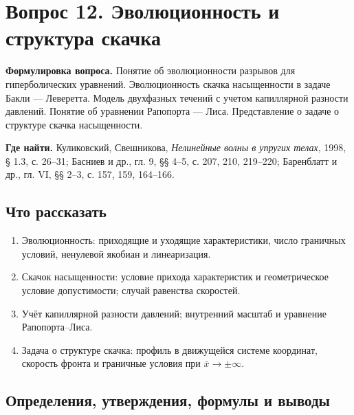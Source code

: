 \documentclass[12pt,a4paper]{article}
\newcounter{questionnumber}
\begin{document}
\clearpage
\setcounter{questionnumber}{12}
\setcounter{equation}{0}
\setcounter{footnote}{0}
\section*{Вопрос 12. Эволюционность и структура скачка}
\textbf{Формулировка вопроса.} Понятие об эволюционности разрывов для гиперболических уравнений. Эволюционность скачка насыщенности в задаче Бакли — Леверетта. Модель двухфазных течений с учетом капиллярной разности давлений. Понятие об уравнении Рапопорта — Лиса. Представление о задаче о структуре скачка насыщенности.

\medskip
\textbf{Где найти.} Куликовский, Свешникова, \textit{Нелинейные волны в упругих телах}, 1998, § 1.3, с. 26--31; Басниев и др., гл. 9, §§ 4--5, с. 207, 210, 219--220; Баренблатт и др., гл. VI, §§ 2--3, с. 157, 159, 164--166.

\subsection*{Что рассказать}
\begin{enumerate}
\item Эволюционность: приходящие и уходящие характеристики, число граничных условий, ненулевой якобиан и линеаризация.
\item Скачок насыщенности: условие прихода характеристик и геометрическое условие допустимости; случай равенства скоростей.
\item Учёт капиллярной разности давлений; внутренний масштаб и уравнение Рапопорта--Лиса.
\item Задача о структуре скачка: профиль в движущейся системе координат, скорость фронта и граничные условия при $\bar x\to\pm\infty$.
\end{enumerate}
\subsection*{Определения, утверждения, формулы и выводы}
\begingroup
\end{document}
